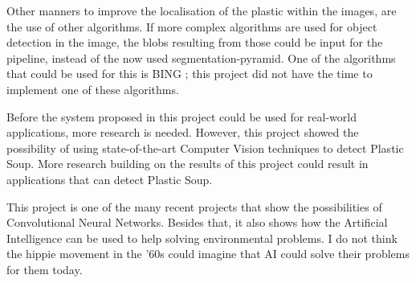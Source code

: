 Other manners to improve the localisation of the plastic within the images, are the use of other algorithms.
If more complex algorithms are used for object detection in the image, the blobs resulting from those could be input for the pipeline, instead of the now used segmentation-pyramid.
One of the algorithms that could be used for this is BING \citeneed; this project did not have the time to implement one of these algorithms.

Before the system proposed in this project could be used for real-world applications, more research is needed.
However, this project showed the possibility of using state-of-the-art Computer Vision techniques to detect Plastic Soup.
More research building on the results of this project could result in applications that can detect Plastic Soup.

This project is one of the many recent projects that show the possibilities of Convolutional Neural Networks.
Besides that, it also shows how the Artificial Intelligence can be used to help solving environmental problems.
I do not think the hippie movement in the '60s could imagine that AI could solve their problems for them today.


